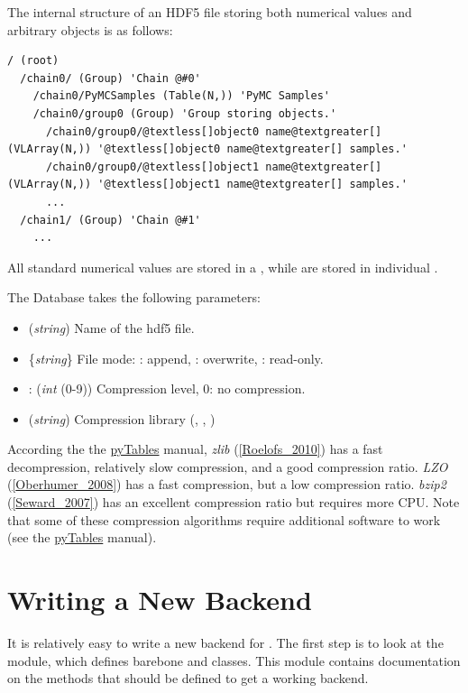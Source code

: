 \documentclass[letterpaper,10pt,english]{sphinxmanual}
\begin{document}
The internal structure of an HDF5 file storing both numerical values and arbitrary objects is as follows:

\begin{Verbatim}[commandchars=@\[\]]
/ (root)
  /chain0/ (Group) 'Chain @#0'
    /chain0/PyMCSamples (Table(N,)) 'PyMC Samples'
    /chain0/group0 (Group) 'Group storing objects.'
      /chain0/group0/@textless[]object0 name@textgreater[] (VLArray(N,)) '@textless[]object0 name@textgreater[] samples.'
      /chain0/group0/@textless[]object1 name@textgreater[] (VLArray(N,)) '@textless[]object1 name@textgreater[] samples.'
      ...
  /chain1/ (Group) 'Chain @#1'
    ...
\end{Verbatim}

All standard numerical values are stored in a , while  are stored in individual .

The  Database takes the following parameters:
\begin{itemize}
\item {} 
 (\emph{string}) Name of the hdf5 file.

\item {} 
 \{\emph{string}\} File mode: : append, : overwrite,
: read-only.

\item {} 
 : (\emph{int} (0-9)) Compression level, 0: no compression.

\item {} 
 (\emph{string}) Compression library (, , )

\end{itemize}

According the the \href{http://www.pytables.org/moin}{pyTables} manual, \emph{zlib} ({\hyperref[references:roelofs-2010]{{[}Roelofs\_2010{]}}}) has a fast decompression, relatively slow compression, and a good compression ratio. \emph{LZO} ({\hyperref[references:oberhumer-2008]{{[}Oberhumer\_2008{]}}}) has a fast compression, but a low compression ratio. \emph{bzip2} ({\hyperref[references:seward-2007]{{[}Seward\_2007{]}}}) has an excellent compression ratio but requires more CPU. Note that some of these compression algorithms require additional software to work (see the \href{http://www.pytables.org/moin}{pyTables} manual).


\section{Writing a New Backend}
\label{database:writing-a-new-backend}
It is relatively easy to write a new backend for . The first step is to look at the  module, which defines barebone  and  classes. This module contains documentation on the methods that should be defined to get a working backend.
\end{document}
